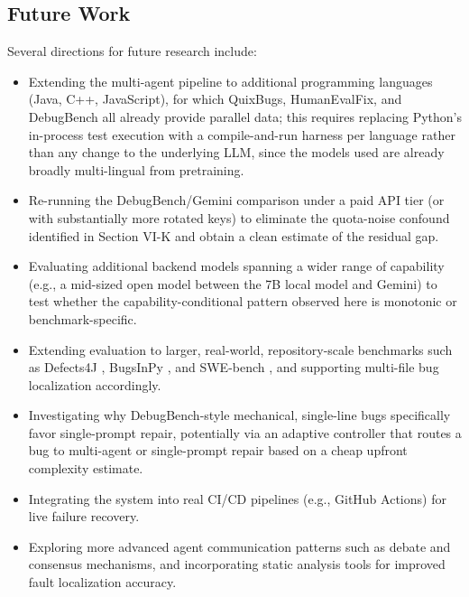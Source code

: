 \documentclass[conference]{IEEEtran}
\begin{document}
\subsection{Future Work}
Several directions for future research include:
\begin{itemize}
    \item Extending the multi-agent pipeline to additional programming languages (Java, C++, JavaScript), for which QuixBugs, HumanEvalFix, and DebugBench all already provide parallel data; this requires replacing Python's in-process test execution with a compile-and-run harness per language rather than any change to the underlying LLM, since the models used are already broadly multi-lingual from pretraining.
    \item Re-running the DebugBench/Gemini comparison under a paid API tier (or with substantially more rotated keys) to eliminate the quota-noise confound identified in Section VI-K and obtain a clean estimate of the residual gap.
    \item Evaluating additional backend models spanning a wider range of capability (e.g., a mid-sized open model between the 7B local model and Gemini) to test whether the capability-conditional pattern observed here is monotonic or benchmark-specific.
    \item Extending evaluation to larger, real-world, repository-scale benchmarks such as Defects4J \cite{defects4j}, BugsInPy \cite{bugsinpy}, and SWE-bench \cite{swebench}, and supporting multi-file bug localization accordingly.
    \item Investigating why DebugBench-style mechanical, single-line bugs specifically favor single-prompt repair, potentially via an adaptive controller that routes a bug to multi-agent or single-prompt repair based on a cheap upfront complexity estimate.
    \item Integrating the system into real CI/CD pipelines (e.g., GitHub Actions) for live failure recovery.
    \item Exploring more advanced agent communication patterns such as debate and consensus mechanisms, and incorporating static analysis tools for improved fault localization accuracy.
\end{itemize}



\end{document}
